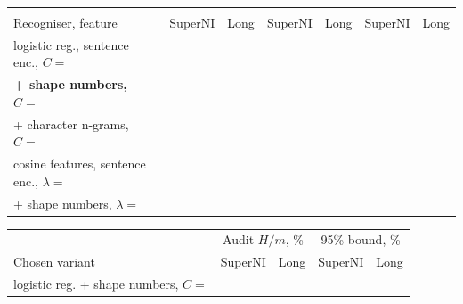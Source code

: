 {\footnotesize\setlength{\tabcolsep}{1.8pt}\begin{tabular}{lrrrrrr}
    \toprule
    &  &  &  \\
    \cmidrule(lr){2-3}\cmidrule(lr){4-5}\cmidrule(l){6-7}
    Recogniser, feature & SuperNI & Long & SuperNI & Long & SuperNI & Long \\
    \midrule
    logistic reg., sentence enc., $C=$\AudRecLrMiniParam{} & \AudRecLrMiniEndSuperni{} & \AudRecLrMiniEndLong{} & \AudRecLrMiniChangedSuperni{} & \AudRecLrMiniChangedLong{} & \AudRecLrMiniAuditLineSuperni{} & \AudRecLrMiniAuditLineLong{} \\
    \textbf{\quad + shape numbers, $C=$\AudRecLrShapeParam{}} & \textbf{\AudRecLrShapeEndSuperni{}} & \textbf{\AudRecLrShapeEndLong{}} & \textbf{\AudRecLrShapeChangedSuperni{}} & \textbf{\AudRecLrShapeChangedLong{}} & \textbf{\AudRecLrShapeAuditLineSuperni{}} & \textbf{\AudRecLrShapeAuditLineLong{}} \\
    \quad + character n-grams, $C=$\AudRecLrCharParam{} & \AudRecLrCharEndSuperni{} & \AudRecLrCharEndLong{} & \AudRecLrCharChangedSuperni{} & \AudRecLrCharChangedLong{} & \AudRecLrCharAuditLineSuperni{} & \AudRecLrCharAuditLineLong{} \\
    cosine features, sentence enc., $\lambda=$\AudRecCosMiniParam{} & \AudRecCosMiniEndSuperni{} & \AudRecCosMiniEndLong{} & \AudRecCosMiniChangedSuperni{} & \AudRecCosMiniChangedLong{} & \AudRecCosMiniAuditLineSuperni{} & \AudRecCosMiniAuditLineLong{} \\
    \quad + shape numbers, $\lambda=$\AudRecCosShapeParam{} & \AudRecCosShapeEndSuperni{} & \AudRecCosShapeEndLong{} & \AudRecCosShapeChangedSuperni{} & \AudRecCosShapeChangedLong{} & \AudRecCosShapeAuditLineSuperni{} & \AudRecCosShapeAuditLineLong{} \\
    \bottomrule
\end{tabular}}
\par\medskip
{\footnotesize\setlength{\tabcolsep}{3pt}\begin{tabular}{lrrrr}
    \toprule
    & \multicolumn{2}{c}{Audit $H/m$, \%} & \multicolumn{2}{c}{95\% bound, \%} \\
    \cmidrule(lr){2-3}\cmidrule(l){4-5}
    Chosen variant & SuperNI & Long & SuperNI & Long \\
    \midrule
    logistic reg. + shape numbers, $C=$\AudRecLrShapeParam{} & \AudRecChosenAuditEstSuperni{} & \AudRecChosenAuditEstLong{} & \AudRecChosenAuditBoundSuperni{} & \AudRecChosenAuditBoundLong{} \\
    \bottomrule
\end{tabular}}
